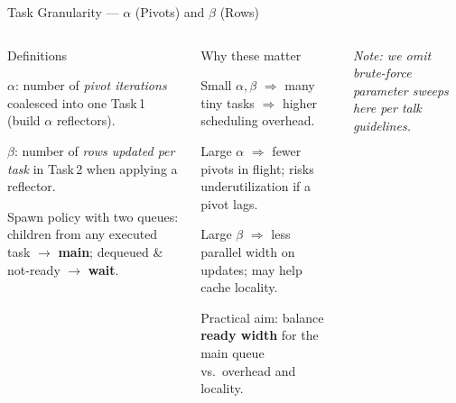 \begin{frame}{Task Granularity — $\alpha$ (Pivots) and $\beta$ (Rows)}
\small
\begin{columns}[T,onlytextwidth]

  \begin{block}{Definitions}
    \begin{tightitem}
      \item $\alpha$: number of \emph{pivot iterations} coalesced into one Task\,1 (build $\alpha$ reflectors).
      \item $\beta$: number of \emph{rows updated per task} in Task\,2 when applying a reflector.
      \item Spawn policy with two queues: children from any executed task $\rightarrow$ \textbf{main}; dequeued \& not-ready $\rightarrow$ \textbf{wait}.
    \end{tightitem}
  \end{block}

  \vspace{1mm}
  \begin{block}{Why these matter}
    \begin{tightitem}
      \item Small $\alpha,\beta$ $\Rightarrow$ many tiny tasks $\Rightarrow$ higher scheduling overhead.
      \item Large $\alpha$ $\Rightarrow$ fewer pivots in flight; risks underutilization if a pivot lags.
      \item Large $\beta$ $\Rightarrow$ less parallel width on updates; may help cache locality.
      \item Practical aim: balance \textbf{ready width} for the main queue vs.\ overhead and locality.
    \end{tightitem}
  \end{block}

  \vspace{1mm}
  {\scriptsize \emph{Note: we omit brute-force parameter sweeps here per talk guidelines.}}

  \centering
\end{columns}
\end{frame}
